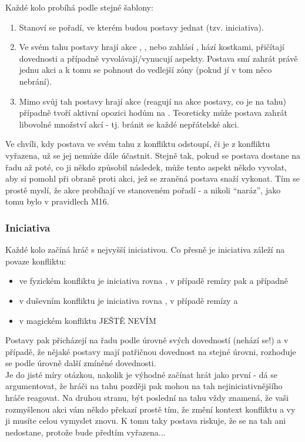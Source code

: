 Každé kolo probíhá podle stejné šablony:

\begin{enumerate}
\item Stanoví se pořadí, ve kterém budou postavy jednat (tzv. iniciativa).
\item Ve svém tahu postavy hrají akce , ,  nebo zahlásí , hází kostkami, přičítají dovednosti a případně vyvolávají/vynucují aspekty. Postava smí zahrát právě jednu akci a k tomu se pohnout do vedlejší zóny (pokud jí v tom něco nebrání).
\item Mimo svůj tah postavy hrají akce  (reagují na akce postavy, co je na tahu) případně tvoří aktivní opozici hodům na . Teoreticky může postava zahrát libovolné množství akcí  - tj. bránit se každé nepřátelské akci.
\end{enumerate}

Ve chvíli, kdy postava ve svém tahu z konfliktu odstoupí, či je z konfliktu vyřazena, už se jej nemůže dále účastnit. Stejně tak, pokud se postava dostane na řadu až poté, co ji někdo způsobil následek, může tento aspekt někdo vyvolat, aby si pomohl při obraně proti akci, jež se zraněná postava snaží vykonat. Tím se prostě myslí, že akce probíhají ve stanoveném pořadí - a nikoli ``naráz'', jako tomu bylo v pravidlech M16.

\subsubsection{Iniciativa}
\label{sec:iniciativa}

Každé kolo začíná hráč s nejvyšší iniciativou. Co přesně je iniciativa záleží na povaze konfliktu:

\begin{itemize}
\item ve fyzickém konfliktu je iniciativa rovna , v případě remízy pak  a případně 
\item v duševním konfliktu je iniciativa rovna , v případě remízy  a 
\item v magickém konfliktu JEŠTĚ NEVÍM
\end{itemize}

Postavy pak přicházejí na řadu podle úrovně svých dovedností (nehází se!) a v případě, že nějaké postavy mají patřičnou dovednost na stejné úrovni, rozhoduje se podle úrovně další zmíněné dovednosti.\\
Je do jisté míry otázkou, nakolik je výhodné začínat hrát jako první - dá se argumentovat, že hráči na tahu později pak mohou na tah nejiniciativnějšího hráče reagovat. Na druhou stranu, být poslední na tahu vždy znamená, že vaši rozmyšlenou akci vám někdo překazí prostě tím, že změní kontext konfliktu a vy ji musíte celou vymyslet znovu. K tomu taky postava riskuje, že se na tah ani nedostane, protože bude předtím vyřazena...


